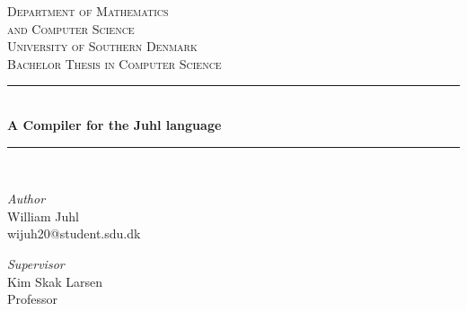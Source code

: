 \documentclass[a4paper,12pt]{report}
\newcommand{\HRule}{\rule{\linewidth}{0.5mm}}
\begin{document}
		
\begin{titlepage}

\center %

\textsc{\LARGE Department of Mathematics}\\[0.3cm]

\textsc{\LARGE and  Computer Science}\\[1.5cm]

\textsc{\Large University of Southern Denmark}\\[0.5cm]

\textsc{\large Bachelor Thesis in Computer Science }\\[0.5cm]

\HRule\\[0.4cm]

{\huge\bfseries A Compiler for the Juhl language}\\[0.4cm]

\HRule\\[1.5cm]

\begin{minipage}{0.47\textwidth}
        \begin{flushleft}
                \large
                \textit{Author}\\
                William Juhl \\ 
                wijuh20@student.sdu.dk
        \end{flushleft}
\end{minipage}

\vfill

\begin{minipage}{0.45\textwidth}
        \begin{flushleft}
                \large
                \textit{Supervisor}\\
                Kim Skak Larsen\\
                Professor
        \end{flushleft}
\end{minipage}


\end{titlepage}
\end{document}
